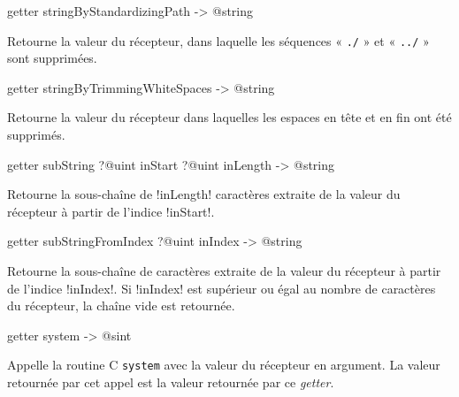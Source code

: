 
\begin{galgasbox}
getter stringByStandardizingPath -> @string
\end{galgasbox}

Retourne la valeur du récepteur, dans laquelle les séquences « \texttt{./} » et « \texttt{../} » sont supprimées.








\begin{galgasbox}
getter stringByTrimmingWhiteSpaces -> @string
\end{galgasbox}

Retourne la valeur du récepteur dans laquelles les espaces en tête et en fin ont été supprimés.





\begin{galgasbox}
getter subString ?@uint inStart ?@uint inLength -> @string
\end{galgasbox}

Retourne la sous-chaîne de \ggs!inLength! caractères extraite de la valeur du récepteur à partir de l'indice \ggs!inStart!.







\begin{galgasbox}
getter subStringFromIndex ?@uint inIndex -> @string
\end{galgasbox}

Retourne la sous-chaîne de caractères extraite de la valeur du récepteur à partir de l'indice \ggs!inIndex!. Si \ggs!inIndex! est supérieur ou égal au nombre de caractères du récepteur, la chaîne vide est retournée.







\begin{galgasbox}
getter system -> @sint
\end{galgasbox}

Appelle la routine C \texttt{system} avec la valeur du récepteur en argument. La valeur retournée par cet appel est la valeur retournée par ce \emph{getter}.






